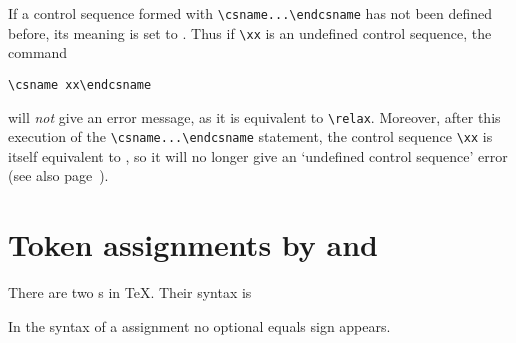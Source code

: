 \documentclass[letterpaper]{book}
\begin{document}
If a control sequence formed with \verb>\csname...\endcsname>
has not been defined
before, its meaning is set to .
Thus if \verb=\xx= is an undefined control sequence, the
command
\begin{verbatim}
\csname xx\endcsname
\end{verbatim}
will {\em not\/}
give an error message, as it is equivalent to \verb=\relax=.
Moreover, after this execution of the
\verb-\csname...\endcsname- statement, the control sequence
\verb=\xx= is itself equivalent to , so it
will no longer give an `undefined control sequence' error
(see also page~\pageref{relax:cs}).


\section{Token assignments by \protect{} and \protect{}}

There are two s in \TeX.
Their syntax is
\begin{disp}%
     \nl
     \end{disp}
In the syntax of a  assignment
no optional equals sign appears.
\end{document}
